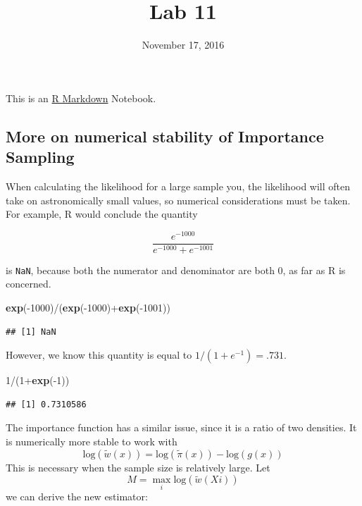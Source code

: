 \documentclass[]{article}
\title{Lab 11}
\author{}
\date{November 17, 2016}
\newenvironment{Shaded}{\begin{snugshade}}{\end{snugshade}}
\newcommand{\KeywordTok}[1]{\textcolor[rgb]{0.13,0.29,0.53}{\textbf{{#1}}}}
\newcommand{\DecValTok}[1]{\textcolor[rgb]{0.00,0.00,0.81}{{#1}}}
\newcommand{\NormalTok}[1]{{#1}}
\begin{document}
\maketitle

This is an \href{http://rmarkdown.rstudio.com}{R Markdown} Notebook.

\subsection{More on numerical stability of Importance
Sampling}\label{more-on-numerical-stability-of-importance-sampling}

When calculating the likelihood for a large sample you, the likelihood
will often take on astronomically small values, so numerical
considerations must be taken. For example, R would conclude the quantity

\[\frac{e^{-1000}}{e^{-1000}+e^{-1001}}\]

is \texttt{NaN}, because both the numerator and denominator are both 0,
as far as R is concerned.

\begin{Shaded}
\begin{Highlighting}[]
\KeywordTok{exp}\NormalTok{(-}\DecValTok{1000}\NormalTok{)/(}\KeywordTok{exp}\NormalTok{(-}\DecValTok{1000}\NormalTok{)+}\KeywordTok{exp}\NormalTok{(-}\DecValTok{1001}\NormalTok{))}
\end{Highlighting}
\end{Shaded}

\begin{verbatim}
## [1] NaN
\end{verbatim}

However, we know this quantity is equal to \(1/(1 + e^{-1}) = .731\).

\begin{Shaded}
\begin{Highlighting}[]
\DecValTok{1}\NormalTok{/(}\DecValTok{1}\NormalTok{+}\KeywordTok{exp}\NormalTok{(-}\DecValTok{1}\NormalTok{))}
\end{Highlighting}
\end{Shaded}

\begin{verbatim}
## [1] 0.7310586
\end{verbatim}

The importance function has a similar issue, since it is a ratio of two
densities. It is numerically more stable to work with
\[\mathrm{log}(\tilde{w}(x)) = \mathrm{log}(\tilde\pi(x))-\mathrm{log}(g(x))\]
This is necessary when the sample size is relatively large. Let
\[M = \max_i \mathrm{log}(\tilde{w}(Xi))\] we can derive the new
estimator:
\end{document}
